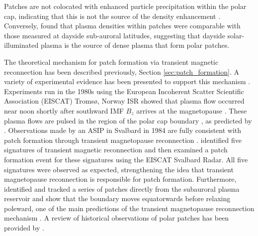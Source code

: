 
Patches are not colocated with enhanced particle precipitation within the polar cap, indicating that this is not the source of the density enhancement \citep{Weber1984}.  Conversely, \citet{Buchau1985} found that plasma densities within patches were comparable with those measured at dayside sub-auroral latitudes, suggesting that dayside solar-illuminated plasma is the source of dense plasma that form polar patches.

The theoretical mechanism for patch formation via transient magnetic reconnection has been described previously, Section \ref{sec:patch_formation}.  A variety of experimental evidence has been presented to support this mechanism \citep{Cowley1998,Carlson2002}.  Experiments run in the 1980s using the European Incoherent Scatter Scientific Association (EISCAT) Troms\o, Norway ISR showed that plasma flow occurred near noon shortly after southward IMF \(B_z\) arrives at the magnetopause \citep{Etemadi1988,Todd1988}.  These plasma flows are pulsed in the region of the polar cap boundary \citep{Lockwood1993a,Lockwood1993b}, as predicted by \citet{Cowley1991}.  Observations made by an ASIP in Svalbard in 1984 are fully consistent with patch formation through transient magnetopause reconnection \citep{Carlson1996,Carlson2002}.  \citet{Carlson2004} identified five signatures of transient magnetic reconnection and then examined a patch formation event for these signatures using the EISCAT Svalbard Radar.  All five signatures were observed as expected, strengthening the idea that transient magnetopause reconnection is responsible for patch formation.  Furthermore, \citet{Carlson2006} identified and tracked a series of patches directly from the subauroral plasma reservoir and show that the boundary moves equatorwards before relaxing poleward, one of the main predictions of the transient magnetopause reconnection mechanism \citep{Lockwood1992b}.  A review of historical observations of polar patches has been provided by \citet{Crowley1996}.



